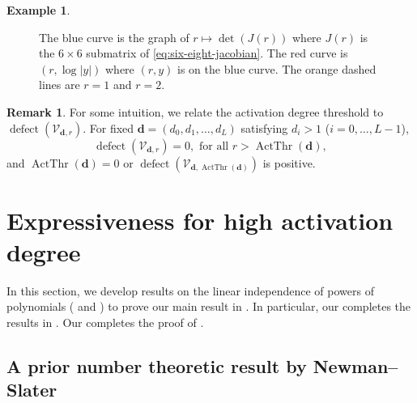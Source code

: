 \documentclass[12pt]{article}
\theoremstyle{definition}
\newtheorem{example}[theorem]{Example}
\newtheorem{remark}[theorem]{Remark}
\DeclareMathOperator{\ActThr}{ActThr}
\DeclareMathOperator{\defect}{defect}
\newcommand{\bfd}{\mathbf{d}}
\begin{document}
\begin{example}
\begin{figure}[hbt!]
\begin{tikzpicture}
    \end{tikzpicture}
    \caption{ The blue curve is the {graph} of 
    $r\mapsto \det(J(r))$ where $J(r)$ is the $6\times 6$ submatrix of \eqref{eq:six-eight-jacobian}. 
    The red curve is $(r,\log|y|)$ where $(r,y)$ is on the blue curve. The orange dashed lines are $r=1$ and $r=2$.
}
    \label{fig:det-log-det-six-eight}
\end{figure}


\end{example}

\begin{remark}
For some intuition, we relate the activation degree threshold to $\defect(\mathcal{V}_{\bfd,r})$. 
For fixed $\mathbf{d} = (d_0,d_1,\dotsc,d_L)$ satisfying $d_i>1$ {($i=0,\dotsc,L-1$)},
\[\defect(\mathcal{V}_{\bfd,r})=0,
\text{ for all }r>\ActThr(\bfd),
\]
and $\ActThr(\bfd)=0$ or 
$\defect(\mathcal{V}_{\bfd,\ActThr(\bfd)})$ is positive.
\end{remark}

\section{Expressiveness for high activation degree}\label{s:high-degree}

In this section, we develop results on the linear independence of powers of polynomials ( and ) to prove our main result in .
In particular, our  completes the results in . Our  completes the proof of \cite[Theorem 14]{KTB2019}.


\subsection{A prior number theoretic result by Newman--Slater}\label{ss:number-theory}
\end{document}
